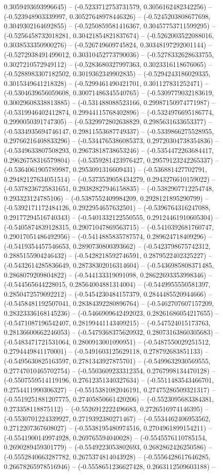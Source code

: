 0.3059493693996645) -- (-0.5233712753731579, 0.3056162482342256) -- (-0.523948903339997, 0.30527648978446326) -- (-0.5245203808677698, 0.3049302164692855) -- (-0.5250859581416367, 0.30457753711599295) -- (-0.5256458732018281, 0.30421854821837674) -- (-0.5262003522088016, 0.3038533350900276) -- (-0.526749609745824, 0.30348197292001144) -- (-0.5272938491499012, 0.30310452773790036) -- (-0.5278332628633755, 0.3027210572949112) -- (-0.5283680327997363, 0.3023316118676065) -- (-0.5288983307182502, 0.3019362349902835) -- (-0.5294243186029335, 0.3015349641218328) -- (-0.5299461490421701, 0.301127831252471) -- (-0.5304639656059608, 0.30071486345540765) -- (-0.5309779032183619, 0.30029608338813885) -- (-0.531488088523166, 0.29987150974771987) -- (-0.5319946402412874, 0.29944115768402896) -- (-0.5324976695186774, 0.2990050391747305) -- (-0.5329972802638829, 0.2985631633653377) -- (-0.5334935694746147, 0.29811553687749337) -- (-0.5339866275528955, 0.29766216408833296) -- (-0.5344765386085373, 0.29720304738354836) -- (-0.5349633807508293, 0.29673818738653246) -- (-0.5354472263684417, 0.29626758316579804) -- (-0.5359281423976427, 0.29579123242265337) -- (-0.5364061905789987, 0.2953091316609431) -- (-0.536881427702791, 0.29482127634051514) -- (-0.5373539058434279, 0.2943276610159022) -- (-0.5378236725831651, 0.29382827946158835) -- (-0.5382907712254748, 0.293323124785106) -- (-0.5387552409984209, 0.2928121895290799) -- (-0.5392171172484126, 0.2922954657632501) -- (-0.5396764316247088, 0.29177294516740343) -- (-0.5401332122550555, 0.29124461910605304) -- (-0.5405874839128315, 0.29071047869563715) -- (-0.5410392681760747, 0.29017051486492956) -- (-0.5414885835787574, 0.289624718409296) -- (-0.5419354457546653, 0.2890730800393662) -- (-0.5423798675742312, 0.2885155904246432) -- (-0.5428218592746591, 0.2879522402325227) -- (-0.5432614285836649, 0.28738302016314604) -- (-0.5436985808371485, 0.2868079209804822) -- (-0.544133319091098, 0.28622693353998346) -- (-0.544565644228015, 0.28564004881314004) -- (-0.5449955550581397, 0.2850472579092212) -- (-0.5454230484157379, 0.2844485520944666) -- (-0.5458481192507041, 0.28384392280896764) -- (-0.5462707607157209, 0.28323336168145236) -- (-0.5466909642492023, 0.28261686054217655) -- (-0.5471087196542407, 0.28199441143409215) -- (-0.547524015173763, 0.28136600662246053) -- (-0.5479368375620932, 0.28073163860305683) -- (-0.5483471721531064, 0.2800913001090951) -- (-0.5487550029251512, 0.2794449841170001) -- (-0.5491603125629118, 0.278792683851133) -- (-0.5495630825163597, 0.2781343927875701) -- (-0.5499632930569555, 0.27747010465702754) -- (-0.5503609233312354, 0.2767998134470128) -- (-0.5507559514119196, 0.27612351340327634) -- (-0.5511483543466701, 0.2754411990306327) -- (-0.5515381082046191, 0.27475286509321317) -- (-0.5519251881207775, 0.27405850661420206) -- (-0.5523095683384381, 0.273358118875112) -- (-0.5526912222496683, 0.2726516974146395) -- (-0.5530701224339927, 0.2719392380271467) -- (-0.5534462406953562, 0.2712207367608027) -- (-0.5538195480974516, 0.2704961899154211) -- (-0.5541900149974928, 0.269765594040028) -- (-0.5545576110785154, 0.2690289459301779) -- (-0.5549223053802693, 0.2682862426250586) -- (-0.5552840663287782, 0.2675374814043928) -- (-0.5556428617646285, 0.26678265978516946) -- (-0.5558651236627428, 0.2663112509603188) -- 